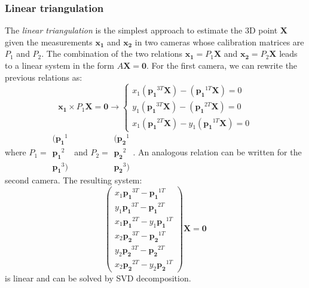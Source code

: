 \subsubsection{Linear triangulation} 
The \emph{linear triangulation} is the simplest approach to estimate the 3D point $\mathbf{X}$ given the measurements $\mathbf{x_1}$ and $\mathbf{x_2}$ in two cameras whose calibration matrices are $P_1$ and $P_2$.
The combination of the two relations $\mathbf{x_1} = P_1 \mathbf{X}$ and $\mathbf{x_2} = P_2 \mathbf{X}$ leads to a linear system in the form $A\mathbf{X} = \mathbf{0}$. 
For the first camera, we can rewrite the previous relations as:
\begin{equation}
  \mathbf{x_1} \times P_1 \mathbf{X} = \mathbf{0} \rightarrow 
  \begin{cases}
    x_1(\mathbf{p_1}^{3T}\mathbf{X}) -    (\mathbf{p_1}^{1T}\mathbf{X}) = 0\\
    y_1(\mathbf{p_1}^{3T}\mathbf{X}) -    (\mathbf{p_1}^{2T}\mathbf{X}) = 0\\
    x_1(\mathbf{p_1}^{2T}\mathbf{X}) - y_1(\mathbf{p_1}^{1T}\mathbf{X}) = 0
  \end{cases}
\end{equation}
where $P_1 = \begin{smallmatrix}(\mathbf{p_1}^1 \\ \mathbf{p_1}^2\\ \mathbf{p_1}^3)\end{smallmatrix}$ and $P_2 = \begin{smallmatrix}(\mathbf{p_2}^1 \\ \mathbf{p_2}^2\\ \mathbf{p_2}^3)\end{smallmatrix}$.
An analogous relation can be written for the second camera.
The resulting system:
\begin{equation}
  \begin{pmatrix}
    x_1\mathbf{p_1}^{3T} -    \mathbf{p_1}^{1T}\\
    y_1\mathbf{p_1}^{3T} -    \mathbf{p_1}^{2T}\\
    x_1\mathbf{p_1}^{2T} - y_1\mathbf{p_1}^{1T}\\
    x_2\mathbf{p_2}^{3T} -    \mathbf{p_2}^{1T}\\
    y_2\mathbf{p_2}^{3T} -    \mathbf{p_2}^{2T}\\
    x_2\mathbf{p_2}^{2T} - y_2\mathbf{p_2}^{1T}
  \end{pmatrix}
  \mathbf{X} = \mathbf{0}
\end{equation}
is linear and can be solved by SVD decomposition.

